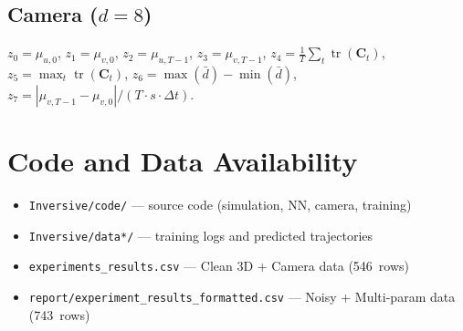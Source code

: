 \documentclass{article}
\begin{document}
\subsection*{Camera ($d=8$)}
$z_0=\mu_{u,0}$, $z_1=\mu_{v,0}$, $z_2=\mu_{u,T-1}$, $z_3=\mu_{v,T-1}$,
$z_4=\frac{1}{T}\sum_t\operatorname{tr}(\mathbf{C}_t)$,
$z_5=\max_t\operatorname{tr}(\mathbf{C}_t)$,
$z_6=\max(\bar{d})-\min(\bar{d})$,
$z_7=|\mu_{v,T-1}-\mu_{v,0}|/(T\cdot s\cdot\Delta t)$.

\section{Code and Data Availability}

\begin{itemize}[itemsep=0pt]
\item \texttt{Inversive/code/} --- source code (simulation, NN, camera, training)
\item \texttt{Inversive/data*/} --- training logs and predicted trajectories
\item \texttt{experiments\_results.csv} --- Clean 3D + Camera data (546~rows)
\item \texttt{report/experiment\_results\_formatted.csv} --- Noisy + Multi-param data (743~rows)
\end{itemize}



\end{document}
